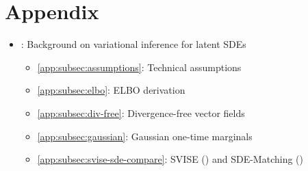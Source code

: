 \clearpage
\appendix
{}

\section*{Appendix}
\begin{itemize}
    \item[~] : Background on variational inference for latent SDEs
    \begin{itemize}
        \item \ref{app:subsec:assumptions}: Technical assumptions
        \item \ref{app:subsec:elbo}: ELBO derivation
        \item \ref{app:subsec:div-free}: Divergence-free vector fields
        \item \ref{app:subsec:gaussian}: Gaussian one-time marginals
        \item \ref{app:subsec:svise-sde-compare}: SVISE (\citet{course2023state}) and SDE-Matching (\citet{bartosh2025sde})
    \end{itemize}


\end{itemize}
